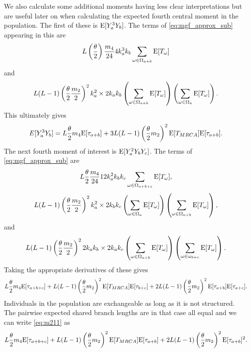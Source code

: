 We also calculate some additional moments having less clear interpretations but
are useful later on when calculating the expected fourth central moment in the
population. The first of these is $\mathrm{E}[Y_a^3Y_b]$. The terms of
\eqref{eq:mgf_approx_sub} appearing in this are
\begin{equation*}
  L \left(\frac{\theta}{2}\right) \frac{m_4}{24} 4 k_a^3k_b \sum_{\omega \in \Omega_{a+b}} \mathrm{E}[T_\omega]
\end{equation*}
and
\begin{equation*}
  L(L-1)\left(\frac{\theta}{2} \frac{m_2}{2}\right)^2 k_a^2 \times 2k_ak_b
  \left( \sum_{\omega \in \Omega_{a+b}} \mathrm{E}[T_\omega] \right) \left( \sum_{\omega \in \Omega_a} \mathrm{E}[T_\omega] \right).
\end{equation*}
This ultimately gives
\begin{equation}
  \label{eq:m31}
  E[Y_a^3Y_b] = L \frac{\theta}{2} m_4 \mathrm{E}[\tau_{a+b}] + 3L(L-1) \left(\frac{\theta}{2} m_2\right)^2 \mathrm{E}[T_{MRCA}]\mathrm{E}[\tau_{a+b}].
\end{equation}
The next fourth moment of interest is $\mathrm{E}[Y_a^2Y_bY_c]$. The terms of
\eqref{eq:mgf_approx_sub} are
\begin{equation*}
  L \frac{\theta}{2} \frac{m_4}{24} 12k_a^2k_bk_c \sum_{\omega \in \Omega_{a+b+c}} \mathrm{E}[T_\omega],
\end{equation*}
\begin{equation*}
  L(L-1) \left(\frac{\theta}{2} \frac{m_2}{2}\right)^2 k_a^2 \times 2k_bk_c
  \left( \sum_{\omega \in \Omega_a} \mathrm{E}[T_\omega] \right)\left( \sum_{\omega \in \Omega_{a+b}} \mathrm{E}[T_\omega] \right),
\end{equation*}
and 
\begin{equation*}
  L(L-1) \left(\frac{\theta}{2} \frac{m_2}{2}\right)^2 2k_ak_b \times 2k_ak_c \left( \sum_{\omega \in \Omega_{a+b}} \mathrm{E}[T_\omega] \right)
  \left( \sum_{\omega \in \omega_{b+c}} \mathrm{E}[T_\omega] \right).
\end{equation*}
Taking the appropriate derivatives of these gives
\begin{equation}
  \label{eq:m211}
  L \frac{\theta}{2} m_4 \mathrm{E}[\tau_{a+b+c}] + L(L-1)\left(\frac{\theta}{2} m_2\right)^2\mathrm{E}[T_{MRCA}]\mathrm{E}[\tau_{b+c}] +
  2L(L-1) \left(\frac{\theta}{2} m_2\right)^2\mathrm{E}[\tau_{a+b}]\mathrm{E}[\tau_{a+c}].
\end{equation}
Individuals in the population are exchangeable as long as it is not structured.
The pairwise expected shared branch lengths are in that case all equal and we
can write \eqref{eq:m211} as
\begin{equation}
  \label{eq:m211s}
  L \frac{\theta}{2} m_4 \mathrm{E}[\tau_{a+b+c}] + L(L-1)\left(\frac{\theta}{2} m_2\right)^2\mathrm{E}[T_{MRCA}]\mathrm{E}[\tau_{a+b}] +
  2L(L-1) \left(\frac{\theta}{2} m_2\right)^2\mathrm{E}[\tau_{a+b}]^2.
\end{equation}
